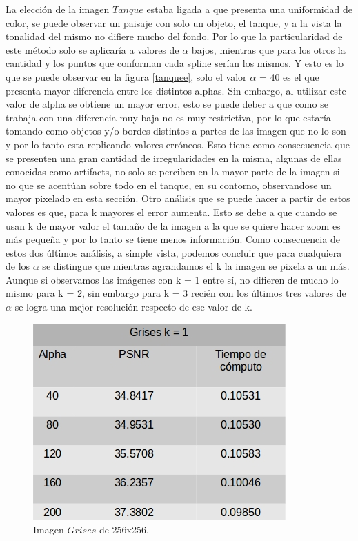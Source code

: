 \documentclass[a4paper]{article}
\newcounter{col}
\begin{document}
La elección de la imagen $Tanque$ estaba ligada a que presenta una uniformidad de color, se puede observar un paisaje con solo un objeto, el tanque, y a la vista la tonalidad del mismo no difiere mucho del fondo. Por lo que la particularidad de este método solo se aplicaría a valores de $\alpha$ bajos, mientras que para los otros la cantidad y los puntos que conforman cada spline serían los mismos. Y esto es lo que se puede observar en la figura \ref{tanquee}, solo el valor $\alpha$ = 40 es el que presenta mayor diferencia entre los distintos alphas. Sin embargo, al utilizar este valor de alpha se obtiene un mayor error, esto se puede deber a que como se trabaja con una diferencia muy baja no es muy restrictiva, por lo que estaría tomando como objetos y/o bordes distintos a partes de las imagen que no lo son y por lo tanto esta replicando valores erróneos. Esto tiene como consecuencia que se presenten una gran cantidad de irregularidades en la misma, algunas de ellas conocidas como artifacts, no solo se perciben en la mayor parte de la imagen si no que se acentúan sobre todo en el tanque, en su contorno, observandose un mayor pixelado en esta sección. 
Otro análisis que se puede hacer a partir de estos valores es que, para k mayores el error aumenta. Esto se debe a que cuando se usan k de mayor valor el tamaño de la imagen a la que se quiere hacer zoom es más pequeña y por lo tanto se tiene menos información. Como consecuencia de estos dos últimos análisis, a simple vista, podemos concluir que para cualquiera de los $\alpha$ se distingue que mientras agrandamos el k la imagen se pixela a un más. Aunque si observamos las imágenes con k = 1 entre sí, no difieren de mucho lo mismo para k = 2, sin embargo para k = 3 recién con los últimos tres valores de $\alpha$ se logra una mejor resolución respecto de ese valor de k. 
        
    
    
    \begin{figure}[H]
    \centering
    \includegraphics[scale=0.4]{imagenes/grises1.jpg}
    \caption{Imagen $Grises$ de 256x256.}
	\label{grisese}
    \end{figure}
    
\end{document}
